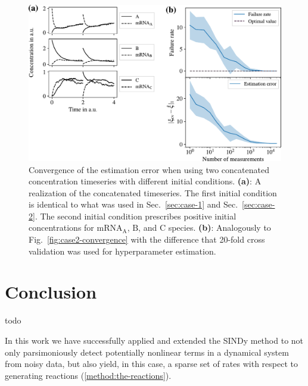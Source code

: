 \documentclass[oneside, abstracton, titlepage]{scrartcl}
\newenvironment{colbox}[1]
{\newcommand\colboxcolor{#1}%
	\begin{lrbox}{\selvestebox}%
		\begin{minipage}{\dimexpr\columnwidth-2\fboxsep\relax}}
		{\end{minipage}\end{lrbox}%
	\begin{center}
		\colorbox[HTML]{\colboxcolor}{\usebox{\selvestebox}}
\end{center}}
\begin{document}
	\begin{figure}
		\centering
		\includegraphics[width=\columnwidth]{./figures_tex/case3}
		\caption{Convergence of the estimation error when using two concatenated concentration timeseries with different initial conditions. \textbf{(a)}: A realization of the concatenated timeseries. The first initial condition is identical to what was used in Sec.~\ref{sec:case-1} and Sec.~\ref{sec:case-2}. The second initial condition prescribes positive initial concentrations for $\mathrm{mRNA}_\mathrm{A}$, $\mathrm{B}$, and $\mathrm{C}$ species. \textbf{(b)}: Analogously to Fig.~\ref{fig:case2-convergence} with the difference that 20-fold cross validation was used for hyperparameter estimation.}
	\end{figure}
    
	\section{Conclusion}
	\begin{colbox}{F8E0E0}
		todo
	\end{colbox}
	In this work we have successfully applied and extended the SINDy method to not only parsimoniously detect potentially nonlinear terms in a dynamical system from noisy data, but also yield, in this case, a sparse set of rates with respect to generating reactions (\ref{method:the-reactions}).

\end{document}
